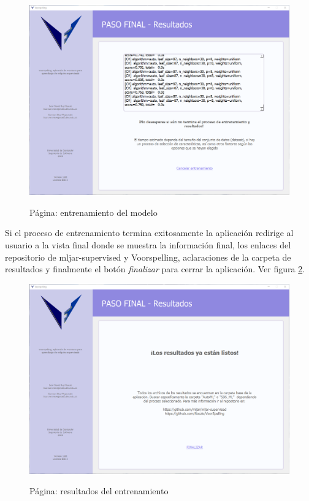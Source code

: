 \begin{figure}[H]
    \centering
    \caption{Página: entrenamiento del modelo}
    \includegraphics[width=\textwidth]{views/training.png}
    \label{fig:training}
\end{figure}

Si el proceso de entrenamiento termina exitosamente la aplicación redirige al usuario a la vista final donde se muestra la información final, los enlaces del repositorio de mljar-supervised y Voorspelling, aclaraciones de la carpeta de resultados y finalmente el botón \textit{finalizar} para cerrar la aplicación. Ver figura \ref{fig:trainingrslt}.

\begin{figure}[H]
    \centering
    \caption{Página: resultados del entrenamiento}
    \includegraphics[width=\textwidth]{views/final.png}
    \label{fig:trainingrslt}
\end{figure}

